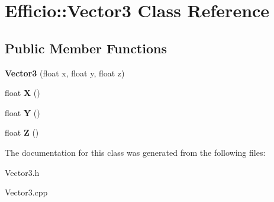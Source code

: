 \hypertarget{class_efficio_1_1_vector3}{}\section{Efficio\+:\+:Vector3 Class Reference}
\label{class_efficio_1_1_vector3}
\subsection*{Public Member Functions}
\begin{DoxyCompactItemize}
\item 
{\bfseries Vector3} (float x, float y, float z)\hypertarget{class_efficio_1_1_vector3_a25ddecf52b20f83dad77f70f5fe856d7}{}\label{class_efficio_1_1_vector3_a25ddecf52b20f83dad77f70f5fe856d7}

\item 
float {\bfseries X} ()\hypertarget{class_efficio_1_1_vector3_a64c3100486b0bb40756a2ab871ec571a}{}\label{class_efficio_1_1_vector3_a64c3100486b0bb40756a2ab871ec571a}

\item 
float {\bfseries Y} ()\hypertarget{class_efficio_1_1_vector3_a2a49ce0090a5505d92c6cefa84afab5e}{}\label{class_efficio_1_1_vector3_a2a49ce0090a5505d92c6cefa84afab5e}

\item 
float {\bfseries Z} ()\hypertarget{class_efficio_1_1_vector3_ab2befc75a1b0c356ac23dd2ae9ef7041}{}\label{class_efficio_1_1_vector3_ab2befc75a1b0c356ac23dd2ae9ef7041}

\end{DoxyCompactItemize}


The documentation for this class was generated from the following files\+:\begin{DoxyCompactItemize}
\item 
Vector3.\+h\item 
Vector3.\+cpp\end{DoxyCompactItemize}
